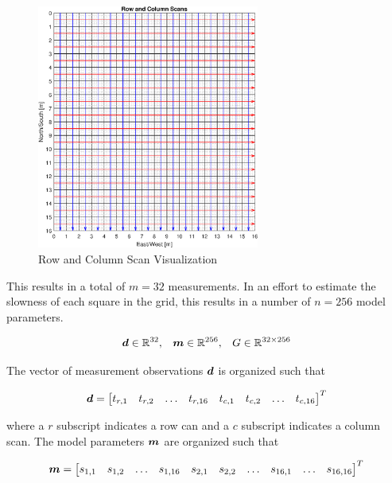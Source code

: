 \begin{figure}[h] 
	\centering
	\includegraphics[width=0.65\textwidth]{./images/prob2_partA_scans_vizualization.eps}
	\caption{Row and Column Scan Visualization}
	\label{fig: prob2 part A row column scan viz}
\end{figure}
\FloatBarrier

This results in a total of $m = 32$ measurements. In an effort to estimate the slowness of each square in the grid, this results in a number of $n = 256$ model parameters. 

\begin{align*}
	\boldsymbol{d} \in \mathbb{R}^{32},\,\,\,\,\,\boldsymbol{m} \in \mathbb{R}^{256},\,\,\,\,\,G \in \mathbb{R}^{32 \times 256}
\end{align*}

The vector of measurement observations $\boldsymbol{d}$ is organized such that

\begin{align*}
	\boldsymbol{d} = \begin{bmatrix}
		t_{r,1} & t_{r,2} & \ldots & t_{r,16} & t_{c,1} & t_{c,2} & \ldots & t_{c,16}
	\end{bmatrix}^T
\end{align*}

where a $r$ subscript indicates a row can and a $c$ subscript indicates a column scan. The model parameters $\boldsymbol{m}$ are organized such that

\begin{align*}
	\boldsymbol{m} = \begin{bmatrix}
		s_{1,1} & s_{1,2} & \ldots & s_{1,16} & s_{2,1} & s_{2,2} & \ldots & s_{16,1} & \ldots & s_{16,16}
	\end{bmatrix}^T
\end{align*}

